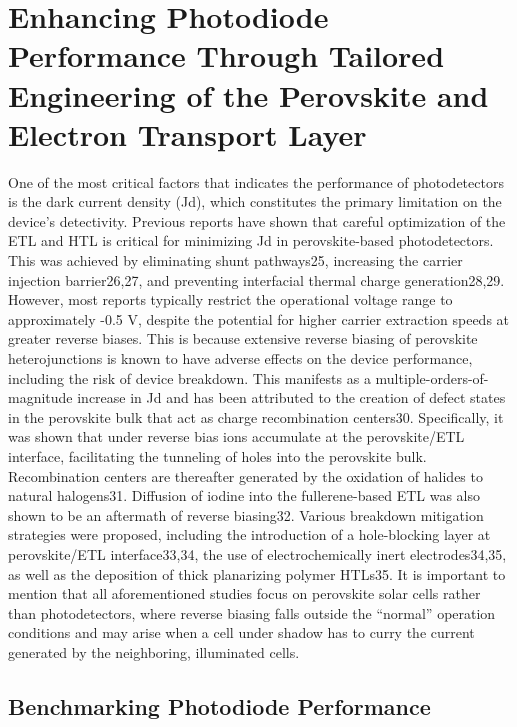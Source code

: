 \chapter{Enhancing Photodiode Performance Through Tailored Engineering of the Perovskite and Electron Transport Layer}\label{ch:transport_layer}


One of the most critical factors that indicates the performance of photodetectors is the dark current density (Jd), which constitutes the primary limitation on the device’s detectivity. Previous reports have shown that careful optimization of the ETL and HTL is critical for minimizing Jd in perovskite-based photodetectors. This was achieved by eliminating shunt pathways25, increasing the carrier injection barrier26,27, and preventing interfacial thermal charge generation28,29. However, most reports typically restrict the operational voltage range to approximately -0.5 V, despite the potential for higher carrier extraction speeds at greater reverse biases. This is because extensive reverse biasing of perovskite heterojunctions is known to have adverse effects on the device performance, including the risk of device breakdown. This manifests as a multiple-orders-of-magnitude increase in Jd and has been attributed to the creation of defect states in the perovskite bulk that act as charge recombination centers30. Specifically, it was shown that under reverse bias ions accumulate at the perovskite/ETL interface, facilitating the tunneling of holes into the perovskite bulk. Recombination centers are thereafter generated by the oxidation of halides to natural halogens31. Diffusion of iodine into the fullerene-based ETL was also shown to be an aftermath of reverse biasing32. Various breakdown mitigation strategies were proposed, including the introduction of a hole-blocking layer at perovskite/ETL interface33,34, the use of electrochemically inert electrodes34,35, as well as the deposition of thick planarizing polymer HTLs35. It is important to mention that all aforementioned studies focus on perovskite solar cells rather than photodetectors, where reverse biasing falls outside the “normal” operation conditions and may arise when a cell under shadow has to curry the current generated by the neighboring, illuminated cells.

\section{Benchmarking Photodiode Performance}


